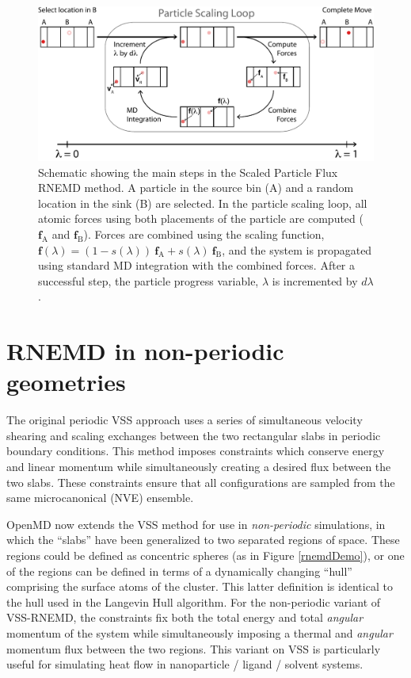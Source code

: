 \documentclass[letterpaper]{report}
\begin{document}
\begin{figure}[H]
    \includegraphics[width=\linewidth]{SPF.pdf}
    \caption[Schematic showing the main steps in the Scaled Particle Flux RNEMD method]{Schematic showing the main steps in the Scaled Particle Flux RNEMD method. A particle in the source bin (A) and a random location in the sink (B) are selected. In the particle scaling loop, all atomic forces using both placements of the particle are computed ($\mathbf{f}_\mathrm{A}$ and $\mathbf{f}_\mathrm{B}$). Forces are combined using the scaling function, $\mathbf{f}(\lambda) = (1-s(\lambda))~\mathbf{f}_\mathrm{A} + s(\lambda)~ \mathbf{f}_\mathrm{B}$, and the system is propagated using standard MD integration with the combined forces. After a successful step, the particle progress variable, $\lambda$ is incremented by $d\lambda$.} 
    \label{fig:SPF} 
\end{figure}

\section{\label{section:nonperiodic}RNEMD in non-periodic geometries}
The original periodic VSS approach uses a series of simultaneous
velocity shearing and scaling exchanges between the two rectangular
slabs in periodic boundary conditions.\cite{2012MolPh.110..691K} This
method imposes constraints which conserve energy and linear momentum 
while simultaneously creating a desired flux between the two
slabs. These constraints ensure that all configurations are sampled
from the same microcanonical (NVE) ensemble.

OpenMD now extends the VSS method for use in {\it non-periodic}
simulations,\cite{Stocker:2014qq} in which the ``slabs'' have been
generalized to two separated regions of space. These regions could be
defined as concentric spheres (as in Figure \ref{rnemdDemo}), or
one of the regions can be defined in terms of a dynamically changing
``hull'' comprising the surface atoms of the cluster. This latter
definition is identical to the hull used in the Langevin Hull
algorithm.\cite{Vardeman2011} For the non-periodic variant of
VSS-RNEMD, the constraints fix both the total energy and total {\it
  angular} momentum of the system while simultaneously imposing a
thermal and {\it angular} momentum flux between the two regions.  This
variant on VSS is particularly useful for simulating heat flow in
nanoparticle / ligand / solvent systems.
\end{document}
